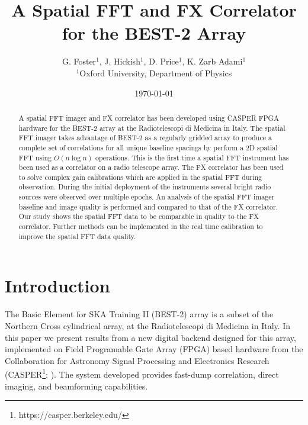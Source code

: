 \documentclass[useAMS,macros,usenatbib,onecolumn]{mn2e}
\title[]{A Spatial FFT and FX Correlator for the BEST-2 Array}
\author[G. Foster, J. Hickish, D. Price and K. Zarb Adami]{G. Foster$^{1}$, J. Hickish$^{1}$, D. Price$^{1}$, K. Zarb Adami$^{1}$\\
$^{1}$Oxford University, Department of Physics}
\begin{document}
\date{\today}

\pagerange{\pageref{firstpage}--\pageref{lastpage}} 

\maketitle

\begin{abstract}
A spatial FFT imager and FX correlator has been developed using CASPER FPGA hardware for the BEST-2 array at the Radiotelescopi di Medicina in Italy.
The spatial FFT imager takes advantage of BEST-2 as a regularly gridded array to produce a complete set of correlations for all unique baseline spacings by perform a 2D spatial FFT using $O(n \log n)$ operations.
This is the first time a spatial FFT instrument has been used as a correlator on a radio telescope array.
The FX correlator has been used to solve complex gain calibrations which are applied in the spatial FFT during observation.
During the initial deployment of the instruments several bright radio sources were observed over multiple epochs.
An analysis of the spatial FFT imager baseline and image quality is performed and compared to that of the FX correlator.
Our study shows the spatial FFT data to be comparable in quality to the FX correlator.
Further methods can be implemented in the real time calibration to improve the spatial FFT data quality.
\end{abstract}

\section{Introduction}

The Basic Element for SKA Training II (BEST-2) array is a subset of the Northern Cross cylindrical array, at the Radiotelescopi di Medicina in Italy.
In this paper we present results from a new digital backend designed for this array, implemented on Field Programable Gate Array (FPGA) based hardware from the Collaboration for Astronomy Signal Processing and Electronics Research (CASPER\footnote{https://casper.berkeley.edu/}; \cite{casper}).
The system developed provides fast-dump correlation, direct imaging, and beamforming capabilities.
\end{document}
